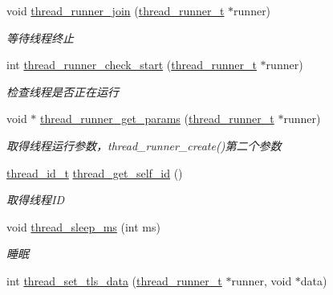 \begin{DoxyCompactItemize}
void \hyperlink{a00109_ga813a718c56e0923be9396630c8460794_ga813a718c56e0923be9396630c8460794}{thread\+\_\+runner\+\_\+join} (\hyperlink{a00051_a9054159cde2f926ef61c28ce1e555199_a9054159cde2f926ef61c28ce1e555199}{thread\+\_\+runner\+\_\+t} $\ast$runner)
\begin{DoxyCompactList}\small\item\em 等待线程终止 \end{DoxyCompactList}\item 
int \hyperlink{a00109_ga95c00ec3d6ef1710cc8d8bb8cb7e585d_ga95c00ec3d6ef1710cc8d8bb8cb7e585d}{thread\+\_\+runner\+\_\+check\+\_\+start} (\hyperlink{a00051_a9054159cde2f926ef61c28ce1e555199_a9054159cde2f926ef61c28ce1e555199}{thread\+\_\+runner\+\_\+t} $\ast$runner)
\begin{DoxyCompactList}\small\item\em 检查线程是否正在运行 \end{DoxyCompactList}\item 
void $\ast$ \hyperlink{a00109_gaf67fa2b2cfefc2de422a31b9dfad2bca_gaf67fa2b2cfefc2de422a31b9dfad2bca}{thread\+\_\+runner\+\_\+get\+\_\+params} (\hyperlink{a00051_a9054159cde2f926ef61c28ce1e555199_a9054159cde2f926ef61c28ce1e555199}{thread\+\_\+runner\+\_\+t} $\ast$runner)
\begin{DoxyCompactList}\small\item\em 取得线程运行参数，thread\+\_\+runner\+\_\+create()第二个参数 \end{DoxyCompactList}\item 
\hyperlink{a00051_ad0ada5642d10ce71bdd90816182f9b79_ad0ada5642d10ce71bdd90816182f9b79}{thread\+\_\+id\+\_\+t} \hyperlink{a00109_gaecf10907eee00ec0e807271c906a6645_gaecf10907eee00ec0e807271c906a6645}{thread\+\_\+get\+\_\+self\+\_\+id} ()
\begin{DoxyCompactList}\small\item\em 取得线程\+I\+D \end{DoxyCompactList}\item 
void \hyperlink{a00109_gabddf3ac30aac3f22f8c53b7517e6eb35_gabddf3ac30aac3f22f8c53b7517e6eb35}{thread\+\_\+sleep\+\_\+ms} (int ms)
\begin{DoxyCompactList}\small\item\em 睡眠 \end{DoxyCompactList}\item 
int \hyperlink{a00109_gaa187b2cd2c906680890fb4ea2833d665_gaa187b2cd2c906680890fb4ea2833d665}{thread\+\_\+set\+\_\+tls\+\_\+data} (\hyperlink{a00051_a9054159cde2f926ef61c28ce1e555199_a9054159cde2f926ef61c28ce1e555199}{thread\+\_\+runner\+\_\+t} $\ast$runner, void $\ast$data)

\end{DoxyCompactItemize}
